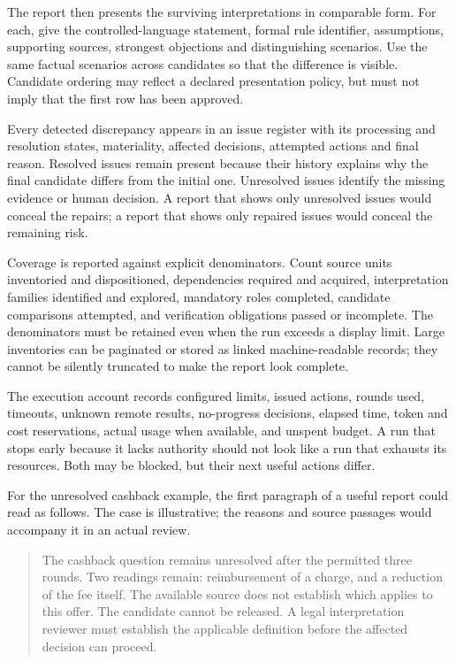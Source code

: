 The report then presents the surviving interpretations in comparable form. For
each, give the controlled-language statement, formal rule identifier, assumptions,
supporting sources, strongest objections and distinguishing scenarios. Use the
same factual scenarios across candidates so that the difference is visible.
Candidate ordering may reflect a declared presentation policy, but must not imply
that the first row has been approved.

Every detected discrepancy appears in an issue register with its processing and
resolution states, materiality, affected decisions, attempted actions and final
reason. Resolved issues remain present because their history explains why the
final candidate differs from the initial one. Unresolved issues identify the
missing evidence or human decision. A report that shows only unresolved issues
would conceal the repairs; a report that shows only repaired issues would conceal
the remaining risk.

Coverage is reported against explicit denominators. Count source units inventoried
and dispositioned, dependencies required and acquired, interpretation families
identified and explored, mandatory roles completed, candidate comparisons
attempted, and verification obligations passed or incomplete. The denominators
must be retained even when the run exceeds a display limit. Large inventories
can be paginated or stored as linked machine-readable records; they cannot be
silently truncated to make the report look complete.


The execution account records configured limits, issued actions, rounds used,
timeouts, unknown remote results, no-progress decisions, elapsed time, token and
cost reservations, actual usage when available, and unspent budget. A run that
stops early because it lacks authority should not look like a run that exhausts
its resources. Both may be blocked, but their next useful actions differ.

For the unresolved cashback example, the first paragraph of a useful report
could read as follows. The case is illustrative; the reasons and source passages
would accompany it in an actual review.

\begin{quote}
The cashback question remains unresolved after the permitted three rounds.
Two readings remain: reimbursement of a charge, and a reduction of the fee
itself. The available source does not establish which applies to this offer.
The candidate cannot be released. A legal interpretation reviewer must establish
the applicable definition before the affected decision can proceed.
\end{quote}

